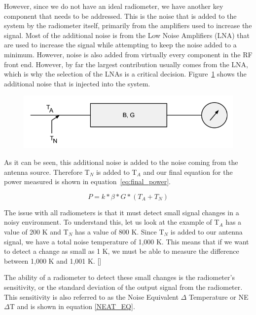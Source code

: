 However, since we do not have an ideal radiometer, we have another key component that needs to be addressed.  This is the noise that is added to the system by the radiometer itself, primarily from the amplifiers used to increase the signal.  Most of the additional noise is from the Low Noise Amplifiers (LNA) that are used to increase the signal while attempting to keep the noise added to a minimum.  However, noise is also added from virtually every component in the RF front end.  However, by far the largest contribution usually comes from the LNA, which is why the selection of the LNAs is a critical decision.  Figure~\ref{noiserad} shows the additional noise that is injected into the system.

{\begin{figure}[h!tb] 
\centering
\includegraphics[width=\textwidth]{Images/radiometer_noise_added.png}
\label{noiserad}
\end{figure}
}

As it can be seen, this additional noise is added to the noise coming from the antenna source.  Therefore T$_{N}$ is added to T$_{A}$ and our final equation for the power measured is shown in equation~\ref{eq:final_power}.  

\begin{equation} \label{eq:final_power}
P=k*\beta*G*(T_{A}+T_{N})
\end{equation}

The issue with all radiometers is that it must detect small signal changes in a noisy environment.  To understand this, let us look at the example of T$_{A}$ has a value of 200 K and T$_{N}$ has a value of 800 K.  Since T$_{N}$ is added to our antenna signal, we have a total noise temperature of 1,000 K.  This means that if we want to detect a change as small as 1 K, we must be able to measure the difference between 1,000 K and 1,001 K. [\cite{skou}]

The ability of a radiometer to detect these small changes is the radiometer's sensitivity, or the standard deviation of the output signal from the radiometer.  This sensitivity is also referred to as the Noise Equivalent $\Delta$ Temperature or NE$\Delta$T and is shown in equation \ref{NEAT_EQ}. 

